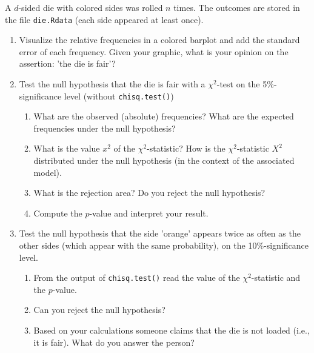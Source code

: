 
\begin{exercise}

A $d$-sided die with colored sides was rolled $n$ times.
The outcomes are stored in the file \texttt{die.Rdata} (each side appeared at least once).

\begin{enumerate}[label = (\alph*)]
    \item Visualize the relative frequencies in a colored barplot and add
    the standard error of each frequency. Given your graphic, what is your
    opinion on the assertion: 'the die is fair'?
    \item Test the null hypothesis that the die is fair with a $\chi^2$-test
    on the 5\%-significance level (without \texttt{chisq.test()})

    \begin{enumerate}[label = \roman*.]
        \item What are the observed (absolute) frequencies?
        What are the expected frequencies under the null hypothesis?
        \item What is the value $x^2$ of the $\chi^2$-statistic?
        How is the $\chi^2$-statistic $X^2$ distributed under the null
        hypothesis (in the context of the associated model).
        \item What is the rejection area? Do you reject the null hypothesis?
        \item Compute the $p$-value and interpret your result.
    \end{enumerate}

    \item Test the null hypothesis that the side 'orange' appears twice as
    often as the other sides (which appear with the same probability),
    on the 10\%-significance level.

    \begin{enumerate}[label = \roman*.]
        \item From the output of \texttt{chisq.test()} read the value
        of the $\chi^2$-statistic and the $p$-value.
        \item Can you reject the null hypothesis?
        \item Based on your calculations someone claims that the die is not
        loaded (i.e., it is fair). What do you answer the person?
    \end{enumerate}
\end{enumerate}

\end{exercise}


